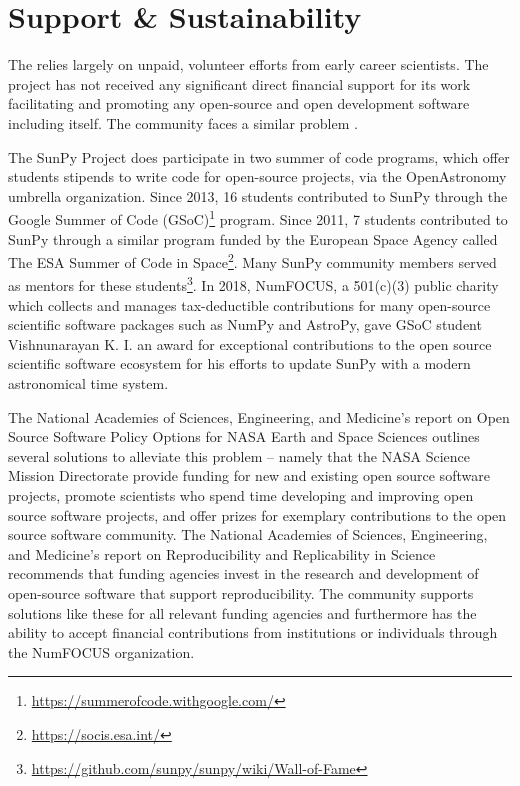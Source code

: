 \section{Support \& Sustainability}

The \sunpyproj relies largely on unpaid, volunteer efforts from early career scientists. 
The project has not received any significant direct financial support for its work facilitating and promoting any open-source and open development software including \sunpy itself. 
The \astropy community faces a similar problem \citep{PriceWhelan:2018ji, Muna2016}. 

The SunPy Project does participate in two summer of code programs, which offer students stipends to write code for open-source projects, via the OpenAstronomy umbrella organization. 
Since 2013, 16 students contributed to SunPy through the Google Summer of Code (GSoC)\footnote{\url{https://summerofcode.withgoogle.com/}} program. 
Since 2011, 7 students contributed to SunPy through a similar program funded by the European Space Agency called The ESA Summer of Code in Space\footnote{\url{https://socis.esa.int/}}. 
Many SunPy community members served as mentors for these students\footnote{\url{https://github.com/sunpy/sunpy/wiki/Wall-of-Fame}}. 
In 2018, NumFOCUS, a 501(c)(3) public charity which collects and manages tax-deductible contributions for many open-source scientific software packages such as NumPy and AstroPy, gave GSoC student Vishnunarayan K. I. an award for exceptional contributions to the open source scientific software ecosystem for his efforts to update SunPy with a modern astronomical time system.

The National Academies of Sciences, Engineering, and Medicine's report on Open Source Software Policy Options for NASA Earth and Space Sciences \citep{NAP2018} outlines several solutions to alleviate this problem -- namely that the NASA Science Mission Directorate provide funding for new and existing open source software projects, promote scientists who spend time developing and improving open source software projects, and offer prizes for exemplary contributions to the open source software community. 
The National Academies of Sciences, Engineering, and Medicine's report on Reproducibility and Replicability in Science \citep{NAP2019} recommends that funding agencies invest in the research and development of open-source software that support reproducibility.
The \sunpy community supports solutions like these for all relevant funding agencies and furthermore has the ability to accept financial contributions from institutions or individuals through the NumFOCUS organization.

